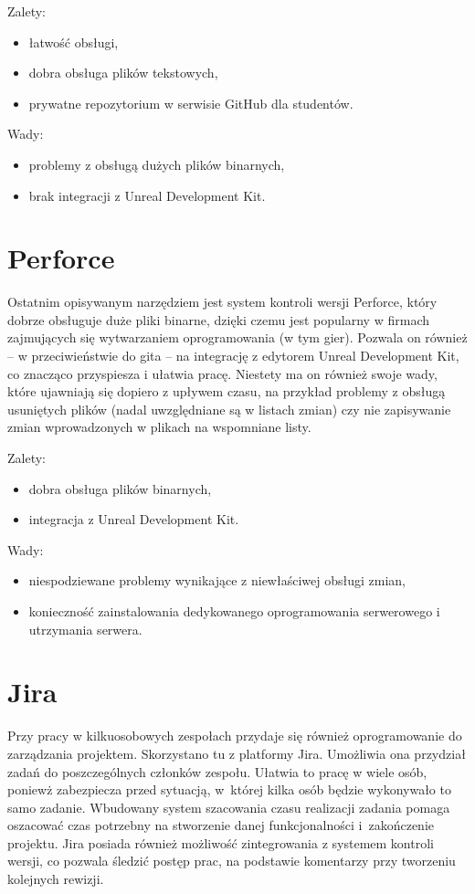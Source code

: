 \raggedright Zalety:
\begin{itemize}
\item łatwość obsługi,
\item dobra obsługa plików tekstowych,
\item prywatne repozytorium w serwisie GitHub dla studentów.
\end{itemize}

\raggedright Wady:
\begin{itemize}
\item problemy z obsługą dużych plików binarnych,
\item brak integracji z Unreal Development Kit.
\end{itemize}

\section{Perforce}

Ostatnim opisywanym narzędziem jest system kontroli wersji Perforce, który dobrze obsługuje duże pliki binarne, dzięki czemu jest popularny w firmach zajmujących się wytwarzaniem oprogramowania (w tym gier). Pozwala on również -- w przeciwieństwie do gita -- na integrację z edytorem Unreal Development Kit, co znacząco przyspiesza i ułatwia pracę. Niestety ma on również swoje wady, które ujawniają się dopiero z upływem czasu, na przykład problemy z obsługą usuniętych plików (nadal uwzględniane są w listach zmian) czy nie zapisywanie zmian wprowadzonych w plikach na wspomniane listy.

\raggedright Zalety:
\begin{itemize}
\item dobra obsługa plików binarnych,
\item integracja z Unreal Development Kit.
\end{itemize}

\raggedright Wady:
\begin{itemize}
\item niespodziewane problemy wynikające z niewłaściwej obsługi zmian,
\item konieczność zainstalowania dedykowanego oprogramowania serwerowego i utrzymania serwera.
\end{itemize}

\section{Jira}

Przy pracy w kilkuosobowych zespołach przydaje się również oprogramowanie do zarządzania projektem. Skorzystano tu z platformy Jira. Umożliwia ona przydział zadań do poszczególnych członków zespołu. Ułatwia to pracę w wiele osób, poniewż zabezpiecza przed sytuacją, w~której kilka osób będzie wykonywało to samo zadanie. Wbudowany system szacowania czasu realizacji zadania pomaga oszacować czas potrzebny na stworzenie danej funkcjonalności i~zakończenie projektu. Jira posiada również możliwość zintegrowania z systemem kontroli wersji, co pozwala śledzić postęp prac, na podstawie komentarzy przy tworzeniu kolejnych rewizji.

